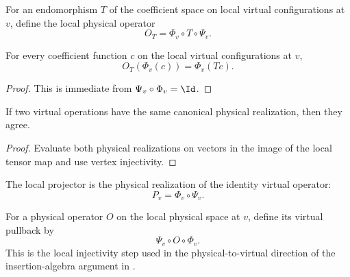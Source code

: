 \begin{definition}%
    \label{def:peps_physRealizeLocalOp}
    \leanok
    For an endomorphism $T$ of the coefficient space on local virtual
    configurations at $v$, define the local physical operator
    \[
        O_T = \Phi_v \circ T \circ \Psi_v.
    \]
\end{definition}

\begin{theorem}%
    \label{thm:peps_physRealizeLocalOp_spec}
    \leanok
    For every coefficient function $c$ on the local virtual configurations at
    $v$,
    \[
        O_T(\Phi_v(c)) = \Phi_v(Tc).
    \]
\end{theorem}
\begin{proof}\leanok
    This is immediate from $\Psi_v \circ \Phi_v = \Id$.
\end{proof}

\begin{theorem}%
    \label{thm:peps_physRealizeLocalOp_injective}
    \leanok
    If two virtual operations have the same canonical physical realization,
    then they agree.
\end{theorem}
\begin{proof}\leanok
    Evaluate both physical realizations on vectors in the image of the local
    tensor map and use vertex injectivity.
\end{proof}

\begin{definition}%
    \label{def:peps_localProjector}
    \leanok
    The local projector is the physical realization of the identity virtual
    operator:
    \[
        P_v = \Phi_v \circ \Psi_v.
    \]
\end{definition}

\begin{definition}%
    \label{def:peps_localVirtualOpOfPhysicalOp}
    \leanok
    For a physical operator $O$ on the local physical space at $v$, define
    its virtual pullback by
    \[
        \Psi_v \circ O \circ \Phi_v.
    \]
    This is the local injectivity step used in the physical-to-virtual
    direction of the insertion-algebra argument in
    \cite[Section~3]{Molnar2018NormalPEPS}.
\end{definition}

